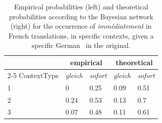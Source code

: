 \begin{table}[t]
  \begin{tabular}{l|ll|ll}
            & \multicolumn{2}{c|}{empirical} & \multicolumn{2}{c}{theoretical}\\\cline{2-5}    
ContextType &  \textit{gleich}     &   \textit{sofort}  & \textit{gleich} & \textit{sofort} \\\hline
1           & 0    & 0.25 & 0.09     & 0.51\\
2           & 0.24 & 0.53 & 0.13      & 0.7\\
3           & 0.07 & 0.48 & 0.11      & 0.61\\
  \end{tabular}
  \cprotect\caption{Empirical probabilities (left) and theoretical probabilities
    according to the Bayesian network (right) for the occurrence of
    \textit{immédiatement} in French translations, in specific
    contexts, given a specific German \ipadv\ in the original.}
  \label{tab:ProbTab}
\end{table}


